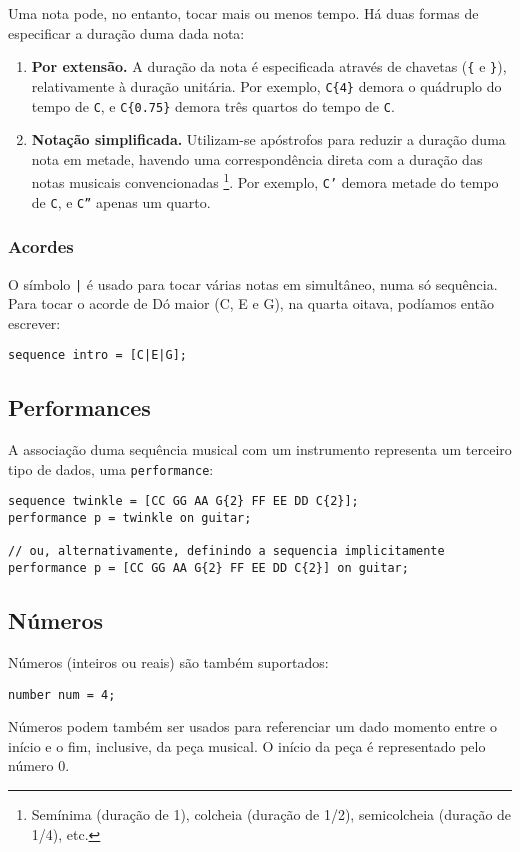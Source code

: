 \documentclass{article}
\begin{document}
Uma nota pode, no entanto, tocar mais ou menos tempo. Há duas formas de especificar a duração duma dada nota:
\begin{enumerate}
    \item \textbf{Por extensão.} A duração da nota é especificada através de chavetas (\texttt{\{} e \texttt{\}}), relativamente à duração unitária. Por exemplo, \texttt{C\{4\}} demora o quádruplo do tempo de \texttt{C}, e \texttt{C\{0.75\}} demora três quartos do tempo de \texttt{C}.
    \item \textbf{Notação simplificada.} Utilizam-se apóstrofos para reduzir a duração duma nota em metade, havendo uma correspondência direta com a duração das notas musicais convencionadas
    \footnote{Semínima (duração de 1), colcheia (duração de 1/2), semicolcheia (duração de 1/4), etc.}. 
    Por exemplo, \texttt{C'} demora metade do tempo de \texttt{C}, e \texttt{C''} apenas um quarto. 
\end{enumerate}

\subsubsection{Acordes}
O símbolo \texttt{|} é usado para tocar várias notas em simultâneo, numa só sequência.
Para tocar o acorde de Dó maior (C, E e G), na quarta oitava, podíamos então escrever:
\begin{lstlisting} 
sequence intro = [C|E|G];
\end{lstlisting}

\subsection{Performances}
A associação duma sequência musical com um instrumento representa um terceiro tipo de dados, uma \texttt{performance}:
\begin{lstlisting} 
sequence twinkle = [CC GG AA G{2} FF EE DD C{2}];
performance p = twinkle on guitar;

// ou, alternativamente, definindo a sequencia implicitamente
performance p = [CC GG AA G{2} FF EE DD C{2}] on guitar;
\end{lstlisting}

\subsection{Números}
Números (inteiros ou reais) são também suportados:
\begin{lstlisting} 
number num = 4;
\end{lstlisting}
Números podem também ser usados para referenciar um dado momento entre o início e o fim, inclusive, da peça musical. O início da peça é representado pelo número 0. 
\end{document}

